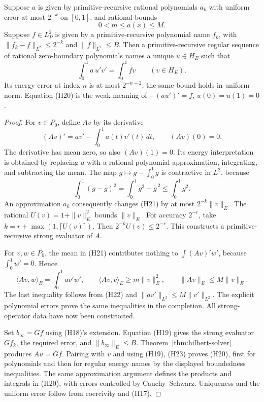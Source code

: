 \begin{theorem}
\label{thm:pde}
Suppose \(a\) is given by primitive-recursive rational polynomials \(a_k\)
with uniform error at most \(2^{-k}\) on \([0,1]\), and rational bounds
\[
                     0<m\leq a(x)\leq M .
\]
Suppose \(f\in L^2_P\) is given by a primitive-recursive polynomial name
\(f_k\), with \(\|f_k-f\|_{L^2}\leq2^{-k}\) and \(\|f\|_{L^2}\leq B\).
Then a primitive-recursive regular sequence of rational zero-boundary
polynomials names a unique \(u\in H_E\) such that
\[
                \int_0^1 a\,u'v'=\int_0^1f v
                         \qquad(v\in H_E).
\tag{H20}
\]
Its energy error at index \(n\) is at most \(2^{-n-2}\); the same bound
holds in uniform norm. Equation (H20) is the weak meaning of
\(-\left(a u'\right)'=f\), \(u(0)=u(1)=0\).
\end{theorem}
\begin{proof}
For \(v\in P_0\), define \(Av\) by its derivative
\[
 (Av)'=a v'-\int_0^1a(t)v'(t)\,dt,\qquad (Av)(0)=0.
\tag{H21}
\]
The derivative has mean zero, so also \((Av)(1)=0\).
Its energy interpretation is obtained by replacing \(a\) with a rational
polynomial approximation, integrating, and subtracting the mean.
The map \(g\mapsto g-\int_0^1g\) is contractive in \(L^2\), because
\[
       \int_0^1(g-\overline g)^2
                      =\int_0^1g^2-\overline g^{\,2}\leq\int_0^1g^2 .
\tag{H22}
\]
An approximation \(a_k\) consequently changes (H21) by at most
\(2^{-k}\|v\|_E\).
The rational \(U(v)=1+\|v\|_E^2\) bounds \(\|v\|_E\).
For accuracy \(2^{-r}\), take
\(k=r+\max(1,\lceil U(v)\rceil)\).
Then \(2^{-k}U(v)\leq2^{-r}\).
This constructs a primitive-recursive strong evaluator of \(A\).

For \(v,w\in P_0\), the mean in (H21) contributes nothing to
\(\int(Av)'w'\), because \(\int_0^1w'=0\). Hence
\[
 \langle Av,w\rangle_E=\int_0^1a v'w',\qquad
 \langle Av,v\rangle_E\geq m\|v\|_E^2,\qquad
 \|Av\|_E\leq M\|v\|_E.
\tag{H23}
\]
The last inequality follows from (H22) and
\(\|a v'\|_{L^2}\leq M\|v'\|_{L^2}\).
The explicit polynomial errors prove the same inequalities in the
completion. All strong-operator data have now been constructed.

Set \(b_\infty=Gf\) using (H18)'s extension. Equation (H19) gives the
strong evaluator \(Gf_k\), the required error, and \(\|b_\infty\|_E\leq B\).
Theorem~\ref{thm:hilbert-solver} produces \(Au=Gf\).
Pairing with \(v\) and using (H19), (H23) proves (H20), first for polynomials
and then for regular energy names by the displayed boundedness inequalities.
The same approximation argument defines the products and integrals in
(H20), with errors controlled by Cauchy--Schwarz.
Uniqueness and the uniform error follow from coercivity and (H17).
\end{proof}

